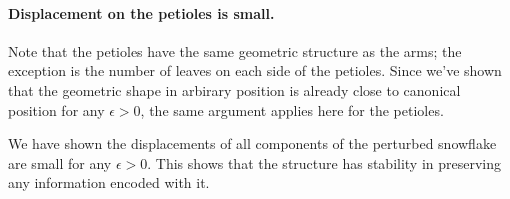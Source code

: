 \paragraph{Displacement on the petioles is small.}
Note that the petioles have the same geometric structure as the arms; the exception is the number of leaves on each side of the petioles. 
Since we've shown that the geometric shape in arbirary position is already close to canonical position for any $\epsilon>0$, the same argument applies here for the petioles.

We have shown the displacements of all components of the perturbed snowflake are small for any $\epsilon > 0$.  
This shows that the structure has stability in preserving any information encoded with it.